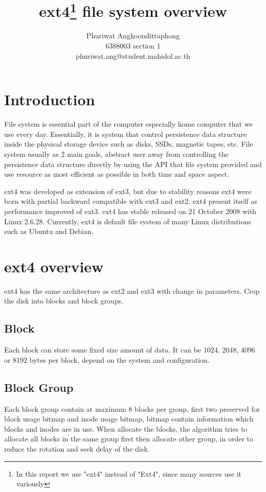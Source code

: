 \documentclass[11pt,a4paper]{article}
\begin{document}

\title{ext4\footnote{In this report we use "ext4" instead of "Ext4", since many sources use it variously} file system overview}
\author{
{Phuriwat Angkoondittaphong}\\
{6388003 section 1}\\
{phuriwat.ang@student.mahidol.ac.th}
}
\date{}
\maketitle

\section{Introduction}

File system is essential part of the computer especially home computer that we use every day. Essentially, it is system that control persistence data structure inside the physical storage device such as disks, SSDs, magnetic tapes, etc. File system usually as 2 main goals, abstract user away from controlling the persistence data structure directly by using the API that file system provided and use resource as most efficient as possible in both time and space aspect. ~\cite{wiki:file_system}

ext4 was developed as extension of ext3, but due to stability reasons ext4 were born with partial backward compatible with ext3 and ext2. ext4 present itself as performance improved of ext3. ext4 has stable released on 21 October 2008 with Linux 2.6.28. Currently, ext4 is default file system of many Linux distributions such as Ubuntu and Debian. ~\cite{Ext4HowtoWiki, wiki:Ext4} 

\section{ext4 overview}
ext4 has the same architecture as ext2 and ext3 with change in parameters. Crop the disk into blocks and block groups. ~\cite{KernalDoc:Ext2}

\subsection{Block}
Each block can store some fixed size amount of data. It can be 1024, 2048, 4096 or 8192 bytes per block, depend on the system and configuration. ~\cite{KernalDoc:Ext2, opensource:intro_to_ext4fs}


\subsection{Block Group}
Each block group contain at maximum 8 blocks per group, first two preserved for block usage bitmap and inode usage bitmap, bitmap contain information which blocks and inodes are in use. When allocate the blocks, the algorithm tries to allocate all blocks in the same group first then allocate other group, in order to reduce the rotation and seek delay of the disk. ~\cite{KernalDoc:Ext2}
\end{document}
